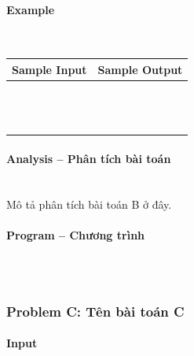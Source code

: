 \documentclass{article}
\begin{document}
\paragraph{Example}\mbox{} \\

\begin{table}[h]
    \centering
    \begin{tabular}{|l|r|}
        \hline
        \textbf{Sample Input} & \textbf{Sample Output} \\
        \hline
		&  \\ 
		&  \\ 
		&  \\ 
		&  \\ 
		&  \\
		&  \\ 
		&  \\ 
		&  \\ 
		&  \\ 
		&  \\ 
		&  \\ 
		&  \\
		&  \\ \hline
    \end{tabular}
\end{table}

\paragraph{Analysis -- Phân tích bài toán} \mbox{} \\

Mô tả phân tích bài toán B ở đây.

\paragraph{Program -- Chương trình} \mbox{} \\

\begin{lstlisting}

\end{lstlisting}

\subsubsection{Problem C: Tên bài toán C}

\paragraph{Input} \mbox{} \\
\end{document}

